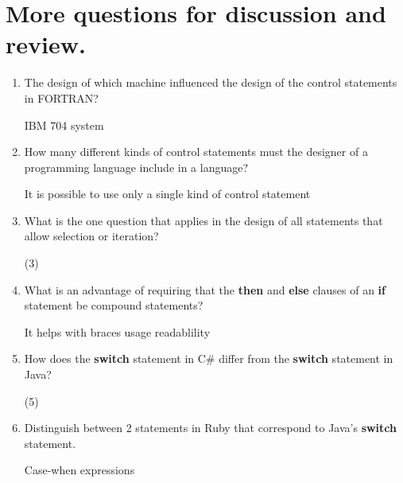 \section{More questions for discussion and review.}

\begin{enumerate}
  \item The design of which machine influenced the design
    of the control statements in FORTRAN?
    
 \begin{answer}
    IBM 704 system 
     \end{answer}

  \item How many different kinds of control statements
    must the designer of a programming language include
    in a language?

 \begin{answer}
    It is possible to use only a single kind of control statement
 \end{answer}
 
  \item What is the one question that applies in the
    design of all statements that allow selection or
    iteration?

 \begin{answer}
    (3)
 \end{answer}
 
  \item What is an advantage of requiring that
    the \textbf{then} and \textbf{else} clauses of
    an \textbf{if} statement be compound statements?

 \begin{answer}
    It helps with braces usage readablility
 \end{answer}
 
  \item How does the \textbf{switch} statement in C\#
    differ from the \textbf{switch} statement in Java?

 \begin{answer}
    (5)
 \end{answer}
 
  \item Distinguish between 2 statements in Ruby
    that correspond to Java's \textbf{switch} statement.

 \begin{answer}
    Case-when expressions 
     \end{answer}


\end{enumerate}
